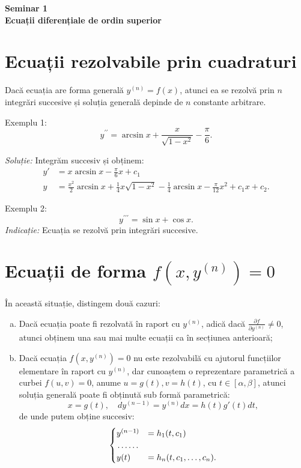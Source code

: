 \documentclass[11pt,a4paper]{article}
\theoremstyle{dotless}
\theoremstyle{dotlessdr}
\begin{document}

\begin{center}
  {\large\textbf{Seminar 1 \\
      Ecuații diferențiale de ordin superior}}
\end{center}

\vspace{2cm}

\section{Ecuații rezolvabile prin cuadraturi}

Dacă ecuația are forma generală $y^{(n)} = f(x)$, atunci ea se rezolvă
prin $n$ integrări succesive și soluția generală depinde de $n$ constante
arbitrare.

Exemplu 1:
\[
  y^{\prime\prime} = \arcsin x + \frac{x}{\sqrt{1 - x^2}} - \frac{\pi}{6}.
\]

\emph{Soluție:} Integrăm succesiv și obținem:
\begin{align*}
  y' &= x\arcsin x - \frac{\pi}{6} x + c_1 \\
  y &= \frac{x^2}{2} \arcsin x + \frac{1}{4} x \sqrt{1 - x^2} - \frac{1}{4}\arcsin x - %
      \frac{\pi}{12}x^2 + c_1 x + c_2.
\end{align*}

\vspace{1cm}

Exemplu 2:
\[
  y^{\prime\prime\prime} = \sin x + \cos x.
\]
\emph{Indicație:} Ecuația se rezolvă prin integrări succesive.


\section{Ecuații de forma $f(x, y^{(n)}) = 0$}

În această situație, distingem două cazuri:
\begin{enumerate}[(a)]
\item Dacă ecuația poate fi rezolvată în raport cu $y^{(n)}$, adică dacă
  $\frac{\partial f}{\partial y^{(n)}} \neq 0$, atunci obținem una sau mai multe
  ecuații ca în secțiunea anterioară;
\item Dacă ecuația $f(x, y^{(n)}) = 0$ nu este rezolvabilă cu ajutorul funcțiilor
  elementare în raport cu $y^{(n)}$, dar cunoaștem o reprezentare parametrică a
  curbei $f(u, v) = 0$, anume $u = g(t), v = h(t)$, cu $t \in [\alpha, \beta]$,
  atunci soluția generală poate fi obținută sub formă parametrică:
  \[
    x = g(t), \quad dy^{(n-1)} = y^{(n)} dx = h(t) g'(t) dt,
  \]
  de unde putem obține succesiv:
  \[
    \begin{cases}
      y^{(n-1)} &= h_1(t, c_1) \\
      \dotfill \\
      y(t) &= h_n(t, c_1, \dots, c_n).
    \end{cases}
  \]
\end{enumerate}
\end{document}
